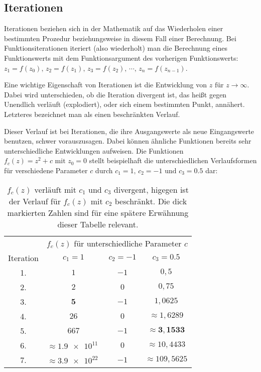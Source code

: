 \subsection{Iterationen}\label{subsec:iterations}

Iterationen beziehen sich in der Mathematik auf das Wiederholen einer bestimmten
Prozedur beziehungsweise in diesem Fall einer Berechnung.
Bei Funktionsiterationen iteriert (also wiederholt) man die Berechnung eines
Funktionswerts mit dem Funktionsargument des vorherigen Funktionswerts:
$z_1 = f(z_0),\, z_2 = f(z_1),\, z_3 = f(z_2),\, \cdots,\, z_n = f(z_{n-1})$.

Eine wichtige Eigenschaft von Iterationen ist die Entwicklung von
$z \text{ für } z \to \infty$.
Dabei wird unterschieden, ob die Iteration divergent ist,
das heißt gegen Unendlich verl\"auft (\glqq explodiert\grqq),
oder sich einem bestimmten Punkt, ann\"ahert.
Letzteres bezeichnet man als einen beschränkten Verlauf.

Dieser Verlauf ist bei Iterationen, die ihre Ausgangswerte als neue Eingangswerte
benutzen, schwer vorauszusagen.
Dabei k\"onnen \"ahnliche Funktionen bereits sehr unterschiedliche Entwicklungen aufweisen.
Die Funktionen $f_c(z) = z^2 + c \text{ mit } z_0 = 0$ stellt beispielhaft
die unterschiedlichen Verlaufsformen für verschiedene Parameter $c$ durch
$c_1 = 1 \text{, } c_2 = -1 \text{ und } c_3 = 0.5$ dar:

\begin{table}[h!]
  \centering
  \begin{tabular}{@{}cccc@{}}
    \toprule
    & \multicolumn{3}{c}{$f_c(z)$ für unterschiedliche Parameter $c$} \\
    \cmidrule(lr){2-4}
    Iteration & $ c_1 = 1$ & $ c_2 = -1$ & $ c_3 = 0.5$ \\
    \midrule
    1. & $1$ & $-1$ & $0,5$ \\
    2. & $2$ & $0$ & $0,75$ \\
    3. & $\boldsymbol{5}$ & $-1$ & $1,0625$ \\
    4. & $26$ & $0$ & $\approx 1,6289 $ \\
    5. & $667$ & $-1$ & $\approx \boldsymbol{3,1533} $ \\
    6. & $\approx \num{1,9e11}\ $ & $0$ & $\approx 10,4433 $ \\
    7. & $\approx \num{3,9e22}\ $ & $-1$ & $\approx 109,5625 $ \\
    \bottomrule
  \end{tabular}
  \caption{
    $f_c(z) \text{ verl\"auft mit } c_1 \text{ und } c_3$ divergent,
    higegen ist der Verlauf f\"ur $f_c(z) \text{ mit } c_2$ beschr\"ankt.
    Die dick markierten Zahlen sind für eine spätere Erwähnung dieser Tabelle
    relevant.
  }
  \label{tab:iterations-example}
\end{table}